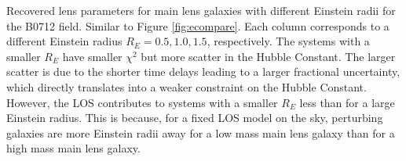 \label{fig:recompare} Recovered lens parameters for main lens galaxies with different Einstein radii for the B0712 field. Similar to Figure \ref{fig:ecompare}. Each column corresponds to a different Einstein radius $R_E = 0.5,1.0,1.5$, respectively. The systems with a smaller $R_E$ have smaller $\chi^2$ but more scatter in the Hubble Constant. The larger scatter is due to the shorter time delays leading to a larger fractional uncertainty, which directly translates into a weaker constraint on the Hubble Constant. However, the LOS contributes to systems with a smaller $R_E$ less than for a large Einstein radius. This is because, for a fixed LOS model on the sky, perturbing galaxies are more Einstein radii away for a low mass main lens galaxy than for a high mass main lens galaxy. 
  